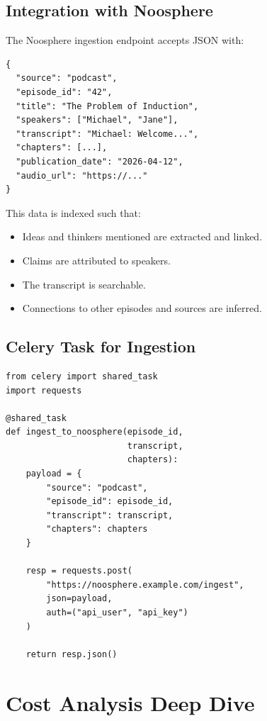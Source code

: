 \documentclass[11pt,letterpaper]{article}
\begin{document}
\subsection{Integration with Noosphere}

The Noosphere ingestion endpoint accepts JSON with:

\begin{verbatim}
{
  "source": "podcast",
  "episode_id": "42",
  "title": "The Problem of Induction",
  "speakers": ["Michael", "Jane"],
  "transcript": "Michael: Welcome...",
  "chapters": [...],
  "publication_date": "2026-04-12",
  "audio_url": "https://..."
}
\end{verbatim}

This data is indexed such that:

\begin{itemize}
  \item Ideas and thinkers mentioned are extracted and linked.
  \item Claims are attributed to speakers.
  \item The transcript is searchable.
  \item Connections to other episodes and sources are inferred.
\end{itemize}

\subsection{Celery Task for Ingestion}

\begin{verbatim}
from celery import shared_task
import requests

@shared_task
def ingest_to_noosphere(episode_id,
                        transcript,
                        chapters):
    payload = {
        "source": "podcast",
        "episode_id": episode_id,
        "transcript": transcript,
        "chapters": chapters
    }

    resp = requests.post(
        "https://noosphere.example.com/ingest",
        json=payload,
        auth=("api_user", "api_key")
    )

    return resp.json()
\end{verbatim}

\vspace{12pt}

\section{Cost Analysis Deep Dive}
\end{document}

